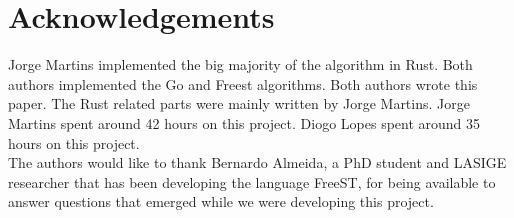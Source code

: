 \documentclass[runningheads]{llncs}
\begin{document}
\section*{Acknowledgements}
Jorge Martins implemented the big majority of the algorithm in Rust. Both authors implemented the Go and Freest algorithms.
Both authors wrote this paper. The Rust related parts were mainly written by Jorge Martins.
Jorge Martins spent around 42 hours on this project. Diogo Lopes spent around 35 hours on this project.\\
The authors would like to thank Bernardo Almeida, a PhD student and LASIGE researcher that has been developing the language FreeST, for being available to answer questions that emerged while we were developing this project.


\end{document}
